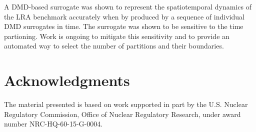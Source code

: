 \documentclass{anstrans}
\begin{document}
A DMD-based surrogate was shown to represent the spatiotemporal dynamics of the LRA benchmark accurately when by produced by a sequence of individual DMD surrogates in time. 
The surrogate was shown to be sensitive to the time partioning.
Work is ongoing to mitigate this sensitivity and to provide an automated way to select the number of partitions and their boundaries.

\section{Acknowledgments}

The material presented is based on work supported in part by the U.S. Nuclear Regulatory Commission, Office of Nuclear Regulatory Research, under award number NRC-HQ-60-15-G-0004.



\end{document}
